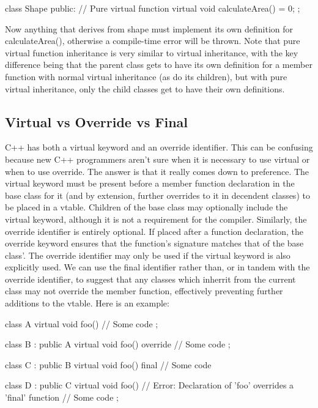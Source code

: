 \documentclass{article}
\begin{document}
\begin{cpplst}

class Shape
{
public:
    // Pure virtual function
    virtual void calculateArea() = 0;
};

\end{cpplst}

Now anything that derives from shape must implement its own definition for calculateArea(), otherwise a
compile-time error will be thrown. Note that pure virtual function inheritance is very similar to virtual
inheritance, with the key difference being that the parent class gets to have its own definition for a member
function with normal virtual inheritance (as do its children), but with pure virtual inheritance, only the
child classes get to have their own definitions.

\subsection{Virtual vs Override vs Final}

C++ has both a virtual keyword and an override identifier. This can be confusing because new C++ programmers
aren't sure when it is necessary to use virtual or when to use override. The answer is that it really comes
down to preference. The virtual keyword must be present before a member function declaration in the base class
for it (and by extension, further overrides to it in decendent classes) to be placed in a vtable. Children of
the base class may optionally include the virtual keyword, although it is not a requirement for the compiler.
Similarly, the override identifier is entirely optional. If placed after a function declaration, the override
keyword ensures that the function's signature matches that of the base class'. The override identifier may only
be used if the virtual keyword is also explicitly used. We can use the final identifier rather than, or in
tandem with the override identifier, to suggest that any classes which inherrit from the current class may not
override the member function, effectively preventing further additions to the vtable. Here is an example:

\begin{cpplst}

class A
{
    virtual void foo()
    {
        // Some code
    }
};

class B : public A
{
    virtual void foo() override
    {
        // Some code
    }
};

class C : public B
{
    virtual void foo() final
    {
        // Some code
    }
}

class D : public C
{
    virtual void foo() // Error: Declaration of 'foo' overrides a 'final' function
    {
        // Some code
    }
};

\end{cpplst}
\end{document}
